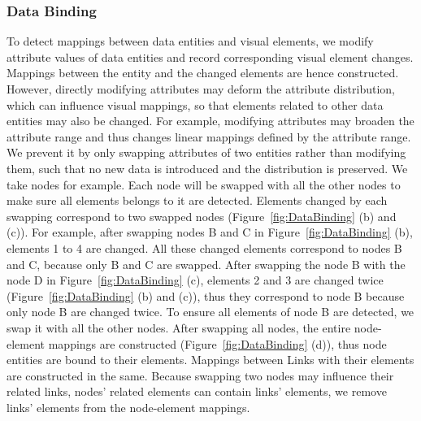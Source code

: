 \subsubsection{Data Binding} \label{sec:databinding}
To detect mappings between data entities and visual elements, 
we modify attribute values of data entities and record corresponding visual element changes.
Mappings between the entity and the changed elements are hence constructed.
However, directly modifying attributes may deform the attribute distribution, which can influence visual mappings, so that elements related to other data entities may also be changed.
For example, modifying attributes may broaden the attribute range and thus changes linear mappings defined by the attribute range.
We prevent it by only swapping attributes of two entities rather than modifying them, such that no new data is introduced and the distribution is preserved.
We take nodes for example.
Each node will be swapped with all the other nodes to make sure all elements belongs to it are detected.
Elements changed by each swapping correspond to two swapped nodes (Figure~\ref{fig:DataBinding} (b) and (c)).
For example, after swapping nodes B and C in Figure~\ref{fig:DataBinding} (b), elements 1 to 4 are changed.
All these changed elements correspond to nodes B and C, because only B and C are swapped.
After swapping the node B with the node D in Figure~\ref{fig:DataBinding} (c), elements 2 and 3 are changed twice (Figure~\ref{fig:DataBinding} (b) and (c)), thus they correspond to node B because only node B are changed twice.
To ensure all elements of node B are detected, we swap it with all the other nodes.
After swapping all nodes, the entire node-element mappings are constructed (Figure~\ref{fig:DataBinding} (d)), thus node entities are bound to their elements.
Mappings between Links with their elements are constructed in the same.
Because swapping two nodes may influence their related links, nodes' related elements can contain links' elements,
we remove links' elements from the node-element mappings.

